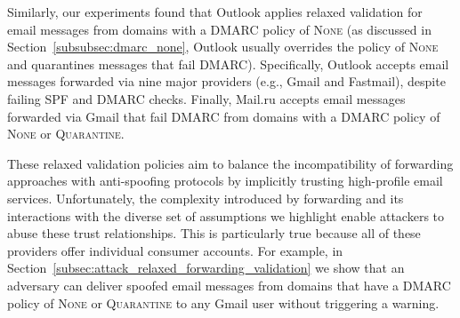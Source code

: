 Similarly, our experiments found that Outlook applies relaxed validation for email messages from domains with a DMARC policy of \textsc{None}
(as discussed in Section~\ref{subsubsec:dmarc_none}, Outlook usually overrides the policy of \textsc{None} and quarantines messages that fail DMARC).
Specifically, Outlook accepts email messages forwarded via nine major providers (e.g., Gmail and Fastmail),
despite failing SPF and DMARC checks.
Finally, Mail.ru accepts email messages forwarded via Gmail that fail DMARC from domains with a DMARC policy of \textsc{None} or \textsc{Quarantine}.


These relaxed validation policies aim to balance the incompatibility of forwarding approaches with anti-spoofing protocols by implicitly trusting high-profile email services.
Unfortunately, the complexity introduced by forwarding and its interactions with the diverse set of assumptions we highlight enable attackers to abuse these trust relationships.  This is particularly true because all of these providers offer individual consumer accounts.
For example, in Section~\ref{subsec:attack_relaxed_forwarding_validation} we show that an adversary can deliver spoofed email messages from domains that have a DMARC policy of \textsc{None} or \textsc{Quarantine} to any Gmail user without triggering a warning.

